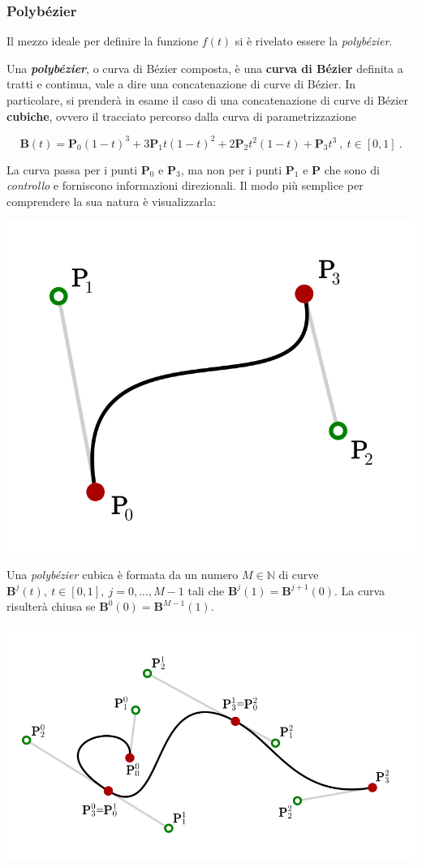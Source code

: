 \documentclass[
]{book}
\begin{document}
\hypertarget{polbezier}{%
\subsubsection{Polybézier}\label{polbezier}}

Il mezzo ideale per definire la funzione \(f(t)\) si è rivelato essere la \emph{polybézier}.

Una \textbf{\emph{polybézier}}, o curva di Bézier composta, è una \textbf{curva di Bézier} definita a tratti e continua, vale a dire una concatenazione di curve di Bézier. In particolare, si prenderà in esame il caso di una concatenazione di curve di Bézier \textbf{cubiche}, ovvero il tracciato percorso dalla curva di parametrizzazione

\begin{equation}
    \mathbf{B}(t)=\mathbf{P}_0(1-t)^3+3\mathbf{P}_1t(1-t)^2+2\mathbf{P}_2t^2(1-t)+\mathbf{P}_3t^3 \ , \ t \in [0,1] \ .
    \label{eq:bezier}
\end{equation}

La curva passa per i punti \(\mathbf{P}_0\) e \(\mathbf{P}_3\), ma non per i punti \(\mathbf{P}_1\) e \(\mathbf{P}\) che sono di \emph{controllo} e forniscono informazioni direzionali. Il modo più semplice per comprendere la sua natura è visualizzarla:

\begin{center}\includegraphics[width=0.36\linewidth]{_images/bezier} \end{center}

Una \emph{polybézier} cubica è formata da un numero \(M \in \mathbb{N}\) di curve \(\mathbf{B}^j(t), \ t \in [0,1], \ j=0,...,M-1\) tali che \(\mathbf{B}^j(1)=\mathbf{B}^{j+1}(0)\). La curva risulterà chiusa se \(\mathbf{B}^0(0)=\mathbf{B}^{M-1}(1)\).

\begin{center}\includegraphics[width=0.75\linewidth]{_images/polybezier} \end{center}
\end{document}
